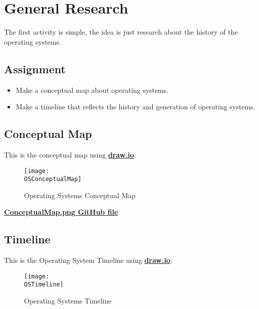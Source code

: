 \section{General Research}

The first activity is simple, the idea is just research about the history of the operating systems.

\subsection{Assignment}
\begin{itemize}
    \item Make a conceptual map about operating systems.
    \item Make a timeline that reflects the history and generation of operating systems.
\end{itemize}

\subsection{Conceptual Map}
This is the conceptual map using \href{https://draw.io/}{\textbf{\color{blue}draw.io}}:

\begin{figure}[h]
    \centering
    \texttt{[image: \\OSConceptualMap]}
    \caption{Operating Systems Conceptual Map}
\end{figure}

\vspace{0.2cm}

\begin{tcolorbox}[enhanced,attach boxed title to top center={yshift=-3mm,yshifttext=-1mm},
  colback=blue!5!white,colframe=blue!75!black,colbacktitle=pinkBanner!80!black,
  title=URL,fonttitle=\bfseries,
  boxed title style={size=small,colframe=blue!75!black} ]
  \centering
  \href{https://github.com/Youngermaster/ST0257-Operating-Systems/blob/main/Challenges/Challenge_0/ConceptualMap.png}{
    \textbf{\color{blue}ConceptualMap.png GitHub file}
  }
\end{tcolorbox}

\subsection{Timeline}
This is the Operating System Timeline using \href{https://draw.io/}{\textbf{\color{blue}draw.io}}:

\begin{figure}[h]
    \centering
    \texttt{[image: \\OSTimeline]}
    \caption{Operating Systems Timeline}
\end{figure}

